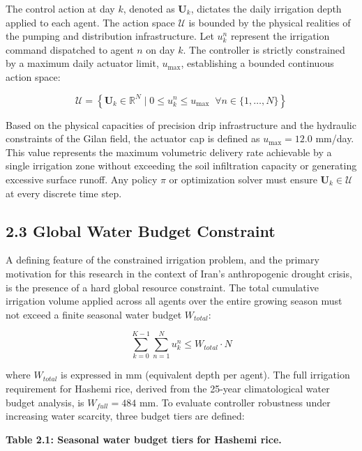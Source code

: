 The control action at day \(k\), denoted as \(\mathbf{U}_k\), dictates
the daily irrigation depth applied to each agent. The action space
\(\mathcal{U}\) is bounded by the physical realities of the pumping and
distribution infrastructure. Let \(u_k^n\) represent the irrigation
command dispatched to agent \(n\) on day \(k\). The controller is
strictly constrained by a maximum daily actuator limit, \(u_{\max}\),
establishing a bounded continuous action space:

\[\mathcal{U} = \left\{ \mathbf{U}_k \in \mathbb{R}^N \mid 0 \leq u_k^n \leq u_{\max} \;\; \forall n \in \{1, \ldots, N\} \right\} \tag{3}\]

Based on the physical capacities of precision drip infrastructure and
the hydraulic constraints of the Gilan field, the actuator cap is
defined as \(u_{\max} = 12.0\) mm/day. This value represents the maximum
volumetric delivery rate achievable by a single irrigation zone without
exceeding the soil infiltration capacity or generating excessive surface
runoff. Any policy \(\pi\) or optimization solver must ensure
\(\mathbf{U}_k \in \mathcal{U}\) at every discrete time step.

\subsection{2.3 Global Water Budget
Constraint}\label{global-water-budget-constraint}

A defining feature of the constrained irrigation problem, and the
primary motivation for this research in the context of Iran's
anthropogenic drought crisis, is the presence of a hard global resource
constraint. The total cumulative irrigation volume applied across all
agents over the entire growing season must not exceed a finite seasonal
water budget \(W_{total}\):

\[\sum_{k=0}^{K-1} \sum_{n=1}^{N} u_k^n \leq W_{total} \cdot N \tag{4}\]

where \(W_{total}\) is expressed in mm (equivalent depth per agent). The
full irrigation requirement for Hashemi rice, derived from the 25-year
climatological water budget analysis, is \(W_{full} = 484\) mm. To
evaluate controller robustness under increasing water scarcity, three
budget tiers are defined:

\textbf{Table 2.1: Seasonal water budget tiers for Hashemi rice.}

